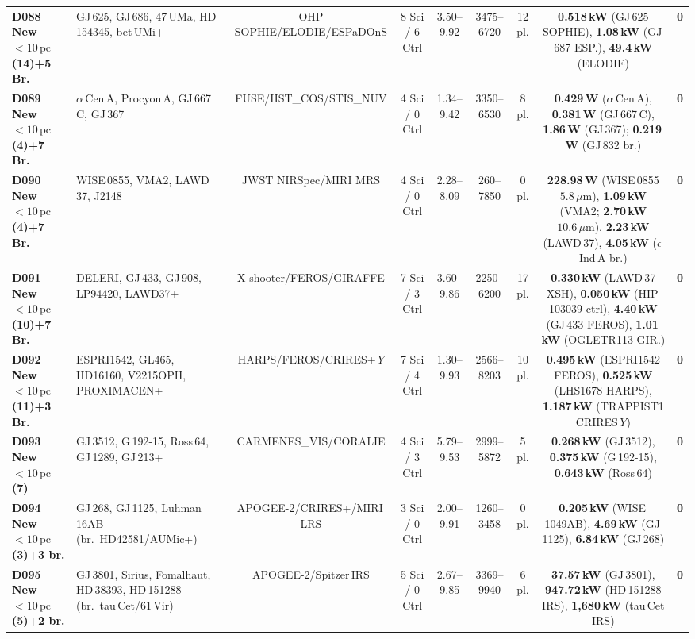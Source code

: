 \documentclass[twocolumn,10pt]{article}
\begin{document}
\begin{table}[p]
{\begin{tabular}{llccccccc}
\textbf{D088 New $<10\,\text{pc}$ (14)+5 Br.} & GJ\,625, GJ\,686, 47\,UMa, HD\,154345, bet\,UMi+ & OHP SOPHIE/ELODIE/ESPaDOnS & 8 Sci / 6 Ctrl & 3.50--9.92 & 3475--6720 & 12 pl. & \textbf{0.518\,kW} (GJ\,625 SOPHIE), \textbf{1.08\,kW} (GJ\,687 ESP.), \textbf{49.4\,kW} (ELODIE) & \textbf{0} \\
\textbf{D089 New $<10\,\text{pc}$ (4)+7 Br.} & $\alpha$\,Cen\,A, Procyon\,A, GJ\,667\,C, GJ\,367 & FUSE/HST\_COS/STIS\_NUV & 4 Sci / 0 Ctrl & 1.34--9.42 & 3350--6530 & 8 pl. & \textbf{0.429\,W} ($\alpha$\,Cen\,A), \textbf{0.381\,W} (GJ\,667\,C), \textbf{1.86\,W} (GJ\,367); \textbf{0.219\,W} (GJ\,832 br.) & \textbf{0} \\
\textbf{D090 New $<10\,\text{pc}$ (4)+7 Br.} & WISE\,0855, VMA2, LAWD\,37, J2148 & JWST NIRSpec/MIRI MRS & 4 Sci / 0 Ctrl & 2.28--8.09 & 260--7850 & 0 pl. & \textbf{228.98\,W} (WISE\,0855 $5.8\,\mu\text{m}$), \textbf{1.09\,kW} (VMA2; \textbf{2.70\,kW} $10.6\,\mu\text{m}$), \textbf{2.23\,kW} (LAWD\,37), \textbf{4.05\,kW} ($\epsilon$\,Ind\,A br.) & \textbf{0} \\
\textbf{D091 New $<10\,\text{pc}$ (10)+7 Br.} & DELERI, GJ\,433, GJ\,908, LP94420, LAWD37+ & X-shooter/FEROS/GIRAFFE & 7 Sci / 3 Ctrl & 3.60--9.86 & 2250--6200 & 17 pl. & \textbf{0.330\,kW} (LAWD\,37 XSH), \textbf{0.050\,kW} (HIP\,103039 ctrl), \textbf{4.40\,kW} (GJ\,433 FEROS), \textbf{1.01\,kW} (OGLETR113 GIR.) & \textbf{0} \\
\textbf{D092 New $<10\,\text{pc}$ (11)+3 Br.} & ESPRI1542, GL465, HD16160, V2215OPH, PROXIMACEN+ & HARPS/FEROS/CRIRES+\,$Y$ & 7 Sci / 4 Ctrl & 1.30--9.93 & 2566--8203 & 10 pl. & \textbf{0.495\,kW} (ESPRI1542 FEROS), \textbf{0.525\,kW} (LHS1678 HARPS), \textbf{1.187\,kW} (TRAPPIST1 CRIRES\,$Y$) & \textbf{0} \\
\textbf{D093 New $<10\,\text{pc}$ (7)} & GJ\,3512, G\,192-15, Ross\,64, GJ\,1289, GJ\,213+ & CARMENES\_VIS/CORALIE & 4 Sci / 3 Ctrl & 5.79--9.53 & 2999--5872 & 5 pl. & \textbf{0.268\,kW} (GJ\,3512), \textbf{0.375\,kW} (G\,192-15), \textbf{0.643\,kW} (Ross\,64) & \textbf{0} \\
\textbf{D094 New $<10\,\text{pc}$ (3)+3 br.} & GJ\,268, GJ\,1125, Luhman\,16AB (br.\ HD42581/AUMic+) & APOGEE-2/CRIRES+/MIRI\,LRS & 3 Sci / 0 Ctrl & 2.00--9.91 & 1260--3458 & 0 pl. & \textbf{0.205\,kW} (WISE\,1049AB), \textbf{4.69\,kW} (GJ\,1125), \textbf{6.84\,kW} (GJ\,268) & \textbf{0} \\
\textbf{D095 New $<10\,\text{pc}$ (5)+2 br.} & GJ\,3801, Sirius, Fomalhaut, HD\,38393, HD\,151288 (br.\ tau\,Cet/61\,Vir) & APOGEE-2/Spitzer\,IRS & 5 Sci / 0 Ctrl & 2.67--9.85 & 3369--9940 & 6 pl. & \textbf{37.57\,kW} (GJ\,3801), \textbf{947.72\,kW} (HD\,151288 IRS), \textbf{1,680\,kW} (tau\,Cet IRS) & \textbf{0} \\

\end{tabular}}
\end{table}
\end{document}
